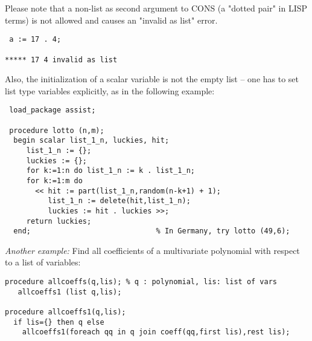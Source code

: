 Please note that a non-list as second argument to CONS
(a "dotted pair" in LISP terms) is not allowed
and causes an "invalid as list" error.
\begin{verbatim}
 a := 17 . 4;

***** 17 4 invalid as list
\end{verbatim}
Also, the initialization of a scalar variable is not the empty list --
one has to set list type variables explicitly, as in the following
example:
\begin{verbatim}
 load_package assist;

 procedure lotto (n,m);
  begin scalar list_1_n, luckies, hit;
     list_1_n := {};
     luckies := {};
     for k:=1:n do list_1_n := k . list_1_n;
     for k:=1:m do
       << hit := part(list_1_n,random(n-k+1) + 1);
          list_1_n := delete(hit,list_1_n);
          luckies := hit . luckies >>;
     return luckies;
  end;                             % In Germany, try lotto (49,6);
\end{verbatim}

{\it Another example:} Find all coefficients of a multivariate
polynomial with respect to a list of variables:

\begin{verbatim}
procedure allcoeffs(q,lis); % q : polynomial, lis: list of vars
   allcoeffs1 (list q,lis);

procedure allcoeffs1(q,lis);
  if lis={} then q else
    allcoeffs1(foreach qq in q join coeff(qq,first lis),rest lis);

\end{verbatim}

